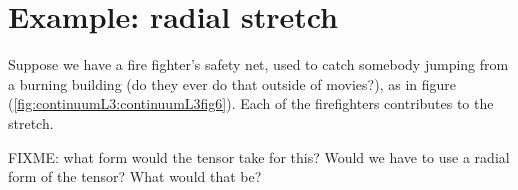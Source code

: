 \section{Example: radial stretch}

Suppose we have a fire fighter's safety net, used to catch somebody jumping from a burning building (do they ever do that outside of movies?), as in figure (\ref{fig:continuumL3:continuumL3fig6}).  Each of the firefighters contributes to the stretch.  


FIXME: what form would the tensor take for this?  Would we have to use a radial form of the tensor?  What would that be?
